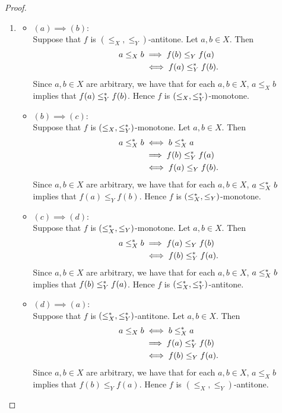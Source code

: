 \documentclass{book}
\begin{document}
	\begin{proof}\
		\begin{enumerate}
			\item 
			\begin{itemize}
				\item $(a) \implies (b)$: \\
				Suppose that $f$ is $(\leq_X, \leq_Y)$-antitone. Let $a,b \in X$. Then 
				\begin{align*}
					a \leq_X b 
					& \implies f(b) \leq_Y f(a) \\
					& \iff f(a) \leq^*_Y f(b).
				\end{align*}
				Since $a,b \in X$ are arbitrary, we have that for each $a,b \in X$, $a \leq_X b$ implies that $f(a) \leq^*_Y f(b)$. Hence $f$ is $(\leq_X, \leq^*_Y)$-monotone. 
				\item $(b) \implies (c)$: \\
				Suppose that $f$ is $(\leq_X, \leq^*_Y)$-monotone. Let $a,b \in X$. Then 
				\begin{align*}
					a \leq^*_X b
					& \iff b \leq^*_X a \\ 
					& \implies f(b) \leq^*_Y f(a) \\
					& \iff f(a) \leq_Y f(b).
				\end{align*}
				Since $a,b \in X$ are arbitrary, we have that for each $a,b \in X$, $a \leq^*_X b$ implies that $f(a) \leq_Y f(b)$. Hence $f$ is $(\leq^*_X, \leq_Y)$-monotone. 
				\item $(c) \implies (d)$: \\
				Suppose that $f$ is $(\leq^*_X, \leq_Y)$-monotone. Let $a,b \in X$. Then 
				\begin{align*}
					a \leq^*_X b
					& \implies f(a) \leq_Y f(b) \\
					& \iff f(b) \leq^*_Y f(a).
				\end{align*}
				Since $a,b \in X$ are arbitrary, we have that for each $a,b \in X$, $a \leq^*_X b$ implies that $f(b) \leq^*_Y f(a)$. Hence $f$ is $(\leq^*_X, \leq^*_Y)$-antitone. 
				\item $(d) \implies (a)$: \\
				Suppose that $f$ is $(\leq^*_X, \leq^*_Y)$-antitone. Let $a,b \in X$. Then 
				\begin{align*}
					a \leq_X b
					& \iff b \leq^*_X a \\
					& \implies f(a) \leq^*_Y f(b) \\
					& \iff f(b) \leq_Y f(a).
				\end{align*}
				Since $a,b \in X$ are arbitrary, we have that for each $a,b \in X$, $a \leq_X b$ implies that $f(b) \leq_Y f(a)$. Hence $f$ is $(\leq_X, \leq_Y)$-antitone. 

\end{itemize}
\end{enumerate}
\end{proof}
\end{document}
